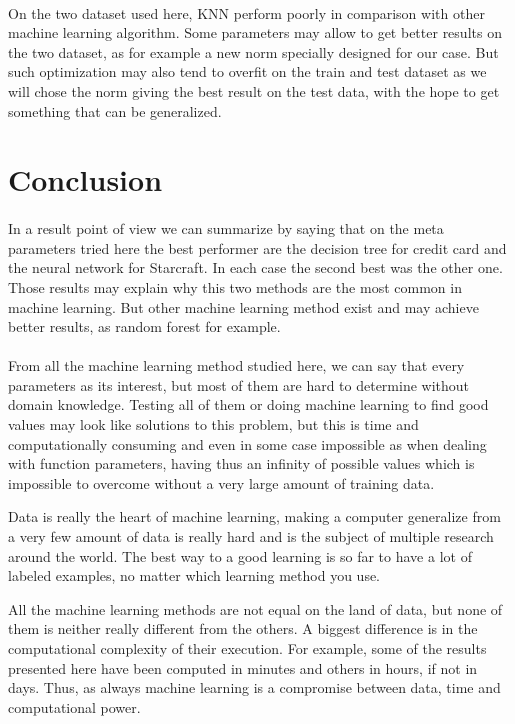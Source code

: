 \documentclass[twocolumn,a4paper,10pt]{article}
\begin{document}
\paragraph{}
On the two dataset used here, KNN perform poorly in comparison with other machine learning algorithm. Some parameters may allow to get better results on the two dataset, as for example a new norm specially designed for our case. But such optimization may also tend to overfit on the train and test dataset as we will chose the norm giving the best result on the test data, with the hope to get something that can be generalized.




\section{Conclusion}
\paragraph{}
In a result point of view we can summarize by saying that on the meta parameters tried here the best performer are the decision tree for credit card and the neural network for Starcraft. In each case the second best was the other one. Those results may explain why this two methods are the most common in machine learning. But other machine learning method exist and may achieve better results, as random forest for example.

\paragraph{}
From all the machine learning method studied here, we can say that every parameters as its interest, but most of them are hard to determine without domain knowledge. Testing all of them or doing machine learning to find good values may look like solutions to this problem, but this is time and computationally consuming and even in some case impossible as when dealing with function parameters, having thus an infinity of possible values which is impossible to overcome without a very large amount of training data.

Data is really the heart of machine learning, making a computer generalize from a very few amount of data is really hard and is the subject of multiple research around the world. The best way to a good learning is so far to have a lot of labeled examples, no matter which learning method you use.

All the machine learning methods are not equal on the land of data, but none of them is neither really different from the others. A biggest difference is in the computational complexity of their execution. For example, some of the results presented here have been computed in minutes and others in hours, if not in days. Thus, as always machine learning is a compromise between data, time and computational power.
\end{document}
